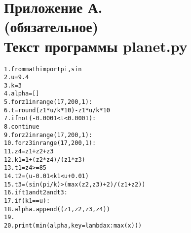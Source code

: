 \section*{Приложение А. \\
	(обязательное) \\
	Текст программы planet.py}

\begin{alltt}
1.  from math import pi, sin
2.  u = 9.4
3.  k = 3
4.  alpha = []
5.  for z1 in range(17, 200, 1):
6.      t = round(z1 * u / k * 10) - z1 * u / k * 10
7.      if not (-0.0001 < t < 0.0001):
8.          continue
9.      for z2 in range(17, 200, 1):
10.          for z3 in range(17, 200, 1):
11.             z4 = z1 + z2 + z3
12.             k1 = 1 + (z2 * z4) / (z1 * z3)
13.             t1 = z4 >= 85
14.             t2 = (u - 0.01 < k1 < u + 0.01)
15.             t3 = (sin(pi / k) > (max(z2, z3) + 2) / (z1 + z2))
16.             if t1 and t2 and t3:
17.                 if (k1 == u):
18.                     alpha.append((z1, z2, z3, z4))
19.
20.  print(min(alpha, key=lambda x:max(x)))
\end{alltt}

\label{final_page}